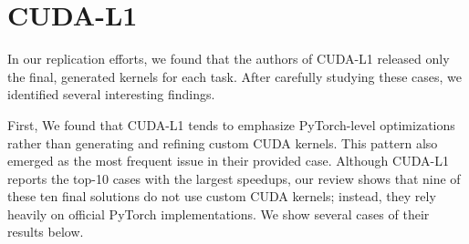 \section{CUDA-L1}\label{app:cuda-l1}
In our replication efforts, we found that the authors of CUDA-L1 released only the final, generated kernels for each task. After carefully studying these cases, we identified several interesting findings.

First, We found that CUDA-L1 tends to emphasize PyTorch-level optimizations rather than generating and refining custom CUDA kernels. This pattern also emerged as the most frequent issue in their provided case. Although CUDA-L1 reports the top-10 cases with the largest speedups, our review shows that nine of these ten final solutions do not use custom CUDA kernels; instead, they rely heavily on official PyTorch implementations. We show several cases of their results below.

